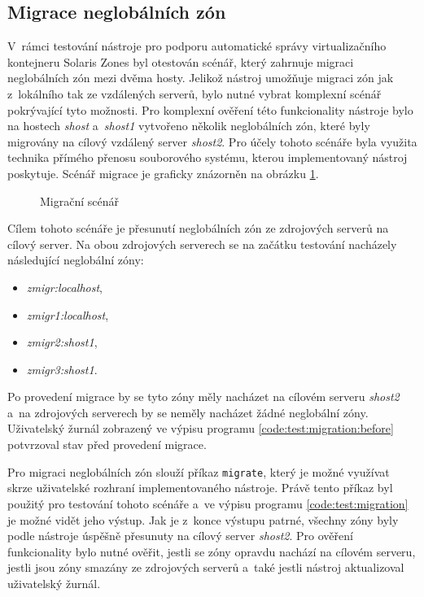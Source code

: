 \subsection{Migrace neglobálních zón}
\label{chapter:testing:scenario:migration}
V~rámci testování nástroje pro podporu automatické správy virtualizačního kontejneru Solaris Zones byl otestován scénář, který
zahrnuje migraci neglobálních zón mezi dvěma hosty. Jelikož nástroj umožňuje migraci zón jak z~lokálního tak ze vzdálených serverů,
bylo nutné vybrat komplexní scénář pokrývající tyto možnosti. Pro komplexní ověření této funkcionality nástroje bylo na hostech 
\textit{shost} a~\textit{shost1} vytvořeno několik neglobálních zón, které byly migrovány na cílový vzdálený server \textit{shost2}. 
Pro účely tohoto scénáře byla využita technika přímého přenosu souborového systému, kterou implementovaný nástroj poskytuje.
Scénář migrace je graficky znázorněn na obrázku \ref{image:testing:migration}.
\begin{figure}
    \centering    
    \caption{Migrační scénář}
    \label{image:testing:migration}
\end{figure}

Cílem tohoto scénáře je přesunutí neglobálních zón ze zdrojových serverů na cílový server. Na obou zdrojových serverech se na
začátku testování nacházely následující neglobální zóny:
\begin{itemize}
 \item \textit{zmigr:localhost},
 \item \textit{zmigr1:localhost},
 \item \textit{zmigr2:shost1},
 \item \textit{zmigr3:shost1}.
\end{itemize}
Po provedení migrace by se tyto zóny měly nacházet na cílovém serveru \textit{shost2} a~na zdrojových serverech by se neměly
nacházet žádné neglobální zóny. Uživatelský žurnál zobrazený ve výpisu programu \ref{code:test:migration:before} potvrzoval
stav před provedení migrace.
 
Pro migraci neglobálních zón slouží příkaz \verb|migrate|, který je možné využívat skrze uživatelské rozhraní implementovaného
nástroje. Právě tento příkaz byl použitý pro testování tohoto scénáře a~ve výpisu programu \ref{code:test:migration} je možné vidět jeho
výstup. Jak je z~konce výstupu patrné, všechny zóny byly podle nástroje úspěšně přesunuty na cílový server \textit{shost2}. 
Pro ověření funkcionality bylo nutné ověřit, jestli se zóny opravdu nachází na cílovém serveru, jestli jsou zóny smazány
ze zdrojových serverů a~také jestli nástroj aktualizoval uživatelský žurnál. 

